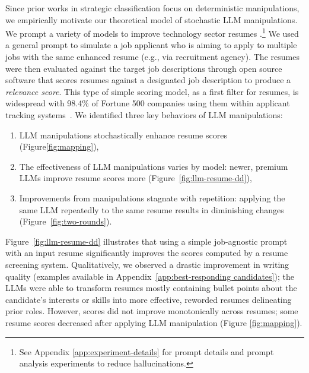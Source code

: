 Since prior works in strategic classification focus on deterministic manipulations, we empirically motivate our theoretical model of stochastic LLM manipulations. We prompt a variety of models to improve technology sector resumes \citep{drushchak-romanyshyn-2024-introducing}.\footnote{See Appendix \ref{app:experiment-details} for prompt details and prompt analysis experiments to reduce hallucinations.}  We used a general prompt to simulate a job applicant who is aiming to apply to multiple jobs with the same enhanced resume (e.g., via recruitment agency).
The resumes were then evaluated against the target job descriptions through open source software that scores resumes against a designated job description to produce a \textit{relevance score}. This type of simple scoring model, as a first filter for resumes, is widespread with 98.4\% of Fortune 500 companies using them within applicant tracking systems~\citep{jobscan2025}.
We identified three key behaviors of LLM manipulations: 
\begin{enumerate}
    \item LLM manipulations stochastically enhance resume scores (Figure\ref{fig:mapping}),
    \item The effectiveness of LLM manipulations varies by model: newer, premium LLMs improve resume scores more (Figure~\ref{fig:llm-resume-dd}),
    \item Improvements from manipulations stagnate with repetition: applying the same LLM repeatedly to the same resume results in diminishing changes (Figure~\ref{fig:two-rounds}). 
\end{enumerate}

Figure~\ref{fig:llm-resume-dd} illustrates that using a simple job-agnostic prompt with an input resume significantly improves the scores computed by a resume screening system. Qualitatively, we observed a drastic improvement in writing quality (examples available in Appendix~\ref{app:best-responding candidates}); the LLMs were able to transform resumes mostly containing bullet points about the candidate's interests or skills into more effective, reworded resumes delineating prior roles. However, scores did not improve monotonically across resumes; some resume scores decreased after applying LLM manipulation (Figure \ref{fig:mapping}). 

